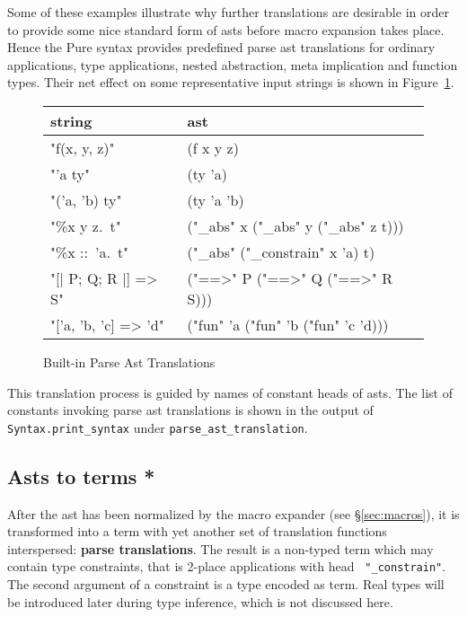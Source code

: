Some of these examples illustrate why further translations are desirable in
order to provide some nice standard form of asts before macro expansion takes
place. Hence the Pure syntax provides predefined parse ast
translations for ordinary applications,
type applications, nested abstraction, meta implication and function types.
Their net effect on some representative input strings is shown in
Figure~\ref{fig:parse_ast_tr}.

\begin{figure}[htb]
\begin{center}
{\tt\begin{tabular}{ll}
\rm string                  & \rm ast \\\hline
"f(x, y, z)"                & (f x y z) \\
"'a ty"                     & (ty 'a) \\
"('a, 'b) ty"               & (ty 'a 'b) \\
"\%x y z.\ t"               & ("_abs" x ("_abs" y ("_abs" z t))) \\
"\%x ::\ 'a.\ t"            & ("_abs" ("_constrain" x 'a) t) \\
"[| P; Q; R |] => S"        & ("==>" P ("==>" Q ("==>" R S))) \\
"['a, 'b, 'c] => 'd"        & ("fun" 'a ("fun" 'b ("fun" 'c 'd)))
\end{tabular}}
\end{center}
\caption{Built-in Parse Ast Translations}
\label{fig:parse_ast_tr}
\end{figure}

This translation process is guided by names of constant heads of asts. The
list of constants invoking parse ast translations is shown in the output of
{\tt Syntax.print_syntax} under {\tt parse_ast_translation}.


\subsection{Asts to terms *}

After the ast has been normalized by the macro expander (see
\S\ref{sec:macros}), it is transformed into a term with yet another set of
translation functions interspersed: {\bf parse translations}. The result is a non-typed term which may
contain type constraints, that is 2-place applications with head {\tt
"_constrain"}. The second argument of a constraint is a type encoded as term.
Real types will be introduced later during type inference, which is not
discussed here.

